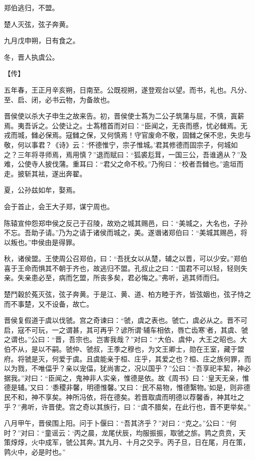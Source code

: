 \documentclass[a4paper,12pt,UTF8,twoside]{ctexbook}
\begin{document}
郑伯逃归，不盟。

楚人灭弦，弦子奔黄。

九月戊申朔，日有食之。

冬，晋人执虞公。

【传】

五年春，王正月辛亥朔，日南至。公既视朔，遂登观台以望。而书，礼也。凡分、至、启、闭，必书云物，为备故也。

晋侯使以杀大子申生之故来告。初，晋侯使士蒍为二公子筑蒲与屈，不慎，寘薪焉。夷吾诉之。公使让之。士蒍稽首而对曰：“臣闻之，无丧而慼，忧必雠焉。无戎而城，雠必保焉。寇雠之保，又何慎焉！守官废命不敬，固雠之保不忠，失忠与敬，何以事君？《诗》云：‘怀德惟宁，宗子惟城。’君其修德而固宗子，何城如之？三年将寻师焉，焉用慎？”退而赋曰：“狐裘尨茸，一国三公，吾谁適从？”及难，公使寺人披伐蒲。重耳曰：“君父之命不校。”乃徇曰：“校者吾雠也。”逾垣而走。披斩其袪，遂出奔翟。

夏，公孙兹如牟，娶焉。

会于首止，会王大子郑，谋宁周也。

陈辕宣仲怨郑申侯之反己于召陵，故劝之城其赐邑，曰：“美城之，大名也，子孙不忘。吾助子请。”乃为之请于诸侯而城之，美。遂谮诸郑伯曰：“美城其赐邑，将以叛也。”申侯由是得罪。

秋，诸侯盟。王使周公召郑伯，曰：“吾抚女以从楚，辅之以晋，可以少安。”郑伯喜于王命而惧其不朝于齐也，故逃归不盟。孔叔止之曰：“国君不可以轻，轻则失亲。失亲患必至，病而乞盟，所丧多矣，君必悔之。”弗听，逃其师而归。

楚鬥穀於菟灭弦，弦子奔黄。于是江、黄、道、柏方睦于齐，皆弦姻也，弦子恃之而不事楚，又不设备，故亡。

晋侯复假道于虞以伐虢。宫之奇谏曰：“虢，虞之表也。虢亡，虞必从之。晋不可启，寇不可玩，一之谓甚，其可再乎？谚所谓‘辅车相依，唇亡齿寒’者，其虞、虢之谓也。”公曰：“晋，吾宗也。岂害我哉？”对曰：“大伯、虞仲，大王之昭也。大伯不从，是以不嗣。虢仲、虢叔，王季之穆也，为文王卿士，勋在王室，藏于盟府。将虢是灭，何爱于虞。且虞能亲于桓、庄乎，其爱之也？桓、庄之族何罪，而以为戮，不唯偪乎？亲以宠偪，犹尚害之，况以国乎？”公曰：“吾享祀丰絜，神必据我。”对曰：“臣闻之，鬼神非人实亲，惟德是依。故《周书》曰：‘皇天无亲，惟德是辅。’又曰：‘黍稷非馨，明德惟馨。’又曰：‘民不易物，惟德繄物。’如是，则非德民不和，神不享矣。神所冯依，将在德矣。若晋取虞而明德以荐馨香，神其吐之乎？”弗听，许晋使。宫之奇以其族行，曰：“虞不腊矣，在此行也，晋不更举矣。”

八月甲午，晋侯围上阳。问于卜偃曰：“吾其济乎？”对曰：“克之。”公曰：“何时？”对曰：“童谣云：‘丙之晨，龙尾伏辰，均服振振，取虢之旂。鹑之贲贲，天策焞焞，火中成军，虢公其奔。’其九月、十月之交乎。丙子旦，日在尾，月在策，鹑火中，必是时也。”
\end{document}
